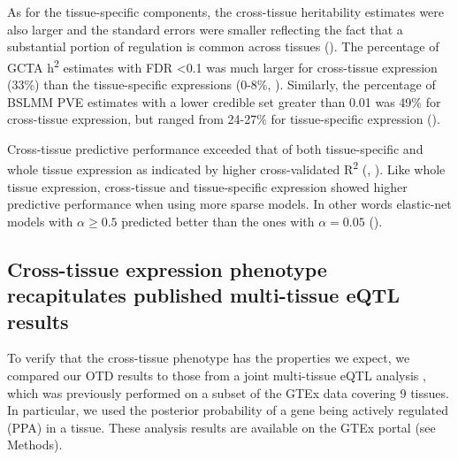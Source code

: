 \documentclass[10pt,letterpaper]{article}
\begin{document}
As for the tissue-specific components, 
the cross-tissue heritability estimates were also larger and the standard errors were smaller reflecting the fact that a substantial portion of regulation is common across tissues (). The percentage of GCTA h\textsuperscript{2} estimates with FDR \textless{0.1}  was much larger for cross-tissue expression (33\%) than the tissue-specific expressions (0-8\%, ). Similarly, the percentage of BSLMM PVE estimates with a lower credible set greater than 0.01 was 49\% for cross-tissue expression, but ranged from 24-27\% for tissue-specific expression ().

Cross-tissue predictive performance exceeded that of both tissue-specific and whole tissue expression as indicated by higher cross-validated R\textsuperscript{2} (, ). Like whole tissue expression, cross-tissue and tissue-specific expression showed higher predictive performance when using more sparse models. In other words elastic-net models with \(\alpha \geq 0.5\) predicted better than the ones with \(\alpha=0.05\) (). 



\subsection*{Cross-tissue expression phenotype recapitulates published multi-tissue eQTL results}

To verify that the cross-tissue phenotype has the properties we expect, we compared our OTD results to those from a joint multi-tissue eQTL analysis  \cite{Flutre_2013}, which was previously performed on a subset of the GTEx data \cite{Ardlie_2015} covering 9 tissues. In particular, we used the posterior probability of a gene being actively regulated (PPA) in a tissue. These analysis results are available on the GTEx portal (see Methods).
\end{document}
